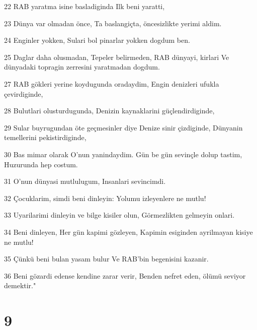 \par 22 RAB yaratma isine basladiginda Ilk beni yaratti,
\par 23 Dünya var olmadan önce, Ta baslangiçta, öncesizlikte yerimi aldim.
\par 24 Enginler yokken, Sulari bol pinarlar yokken dogdum ben.
\par 25 Daglar daha olusmadan, Tepeler belirmeden, RAB dünyayi, kirlari Ve dünyadaki topragin zerresini yaratmadan dogdum.
\par 27 RAB gökleri yerine koydugunda oradaydim, Engin denizleri ufukla çevirdiginde,
\par 28 Bulutlari olusturdugunda, Denizin kaynaklarini güçlendirdiginde,
\par 29 Sular buyrugundan öte geçmesinler diye Denize sinir çizdiginde, Dünyanin temellerini pekistirdiginde,
\par 30 Bas mimar olarak O'nun yanindaydim. Gün be gün sevinçle dolup tastim, Huzurunda hep costum.
\par 31 O'nun dünyasi mutlulugum, Insanlari sevincimdi.
\par 32 Çocuklarim, simdi beni dinleyin: Yolumu izleyenlere ne mutlu!
\par 33 Uyarilarimi dinleyin ve bilge kisiler olun, Görmezlikten gelmeyin onlari.
\par 34 Beni dinleyen, Her gün kapimi gözleyen, Kapimin esiginden ayrilmayan kisiye ne mutlu!
\par 35 Çünkü beni bulan yasam bulur Ve RAB'bin begenisini kazanir.
\par 36 Beni gözardi edense kendine zarar verir, Benden nefret eden, ölümü seviyor demektir."

\chapter{9}

